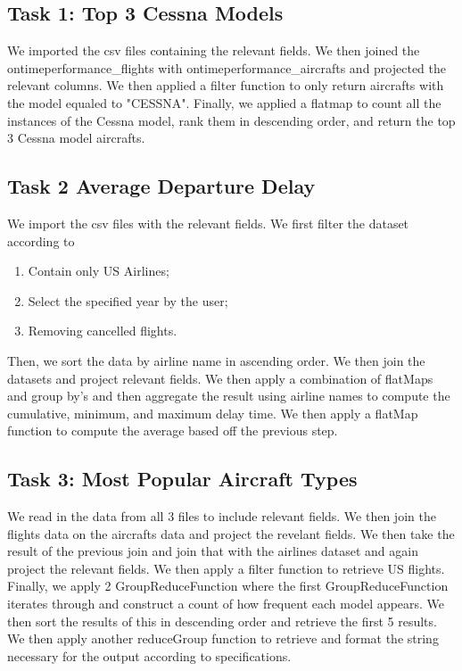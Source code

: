 \documentclass[12pt]{article}
\begin{document}
\subsection*{Task 1: Top 3 Cessna Models}
We imported the csv files containing the relevant fields. We then joined the ontimeperformance\_flights with ontimeperformance\_aircrafts and projected the relevant columns. We then applied a filter function to only return aircrafts with the model equaled to "CESSNA". Finally, we applied a flatmap to count all the instances of the Cessna model, rank them in descending order, and return the top 3 Cessna model aircrafts.
\subsection*{Task 2 Average Departure Delay}
We import the csv files with the relevant fields. We first filter the dataset according to
\begin{enumerate}
\item Contain only US Airlines;
\item Select the specified year by the user;
\item Removing cancelled flights.
\end{enumerate}
Then, we sort the data by airline name in ascending order. We then join the datasets and project relevant fields. We then apply a combination of flatMaps and group by's and then aggregate the result using airline names to compute the cumulative, minimum, and maximum delay time. We then apply a flatMap function to compute the average based off the previous step.
\subsection*{Task 3: Most Popular Aircraft Types}
We read in the data from all 3 files to include relevant fields. We then join the flights data on the aircrafts data and project the revelant fields. We then take the result of the previous join and join that with the airlines dataset and again project the relevant fields. We then apply a filter function to retrieve US flights. Finally, we apply 2 GroupReduceFunction where the first GroupReduceFunction iterates through and construct a count of how frequent each model appears. We then sort the results of this in descending order and retrieve the first 5 results. We then apply another reduceGroup function to retrieve and format the string necessary for the output according to specifications.
\end{document}
